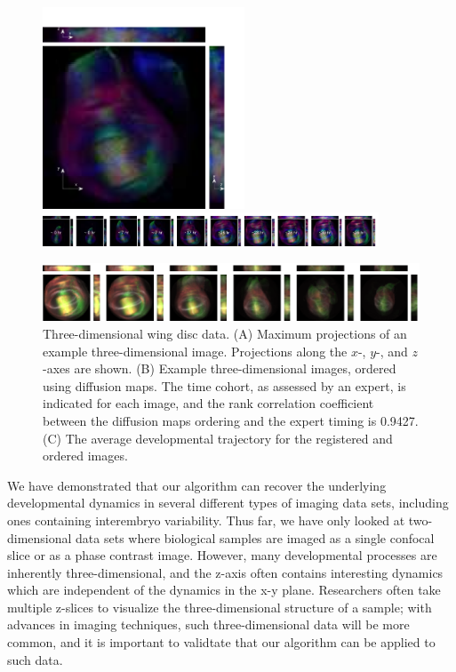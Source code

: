 \documentclass[twocolumn, 10pt]{article}
\begin{document}
\begin{figure}[t]
\includegraphics[width=6cm]{wing_disc_example}
%
\hfill
%
\includegraphics[width=10cm]{wing_disc_ordered}

\vspace{0.25cm}
\includegraphics[width=17.5cm]{wing_disc_average}

\caption{Three-dimensional wing disc data. (A) Maximum projections of an example three-dimensional image. Projections along the $x$-, $y$-, and $z$-axes are shown. (B) Example three-dimensional images, ordered using diffusion maps. The time cohort, as assessed by an expert, is indicated for each image, and the rank correlation coefficient between the diffusion maps ordering and the expert timing is 0.9427. (C) The average developmental trajectory for the registered and ordered images. }
\label{fig:wing_disc}
\end{figure}

We have demonstrated that our algorithm can recover the underlying developmental dynamics in several different types of imaging data sets, including ones containing interembryo variability. 
%
Thus far, we have only looked at two-dimensional data sets where biological samples are imaged as a single confocal slice or as a phase contrast image. 
%
However, many developmental processes are inherently three-dimensional, and the z-axis often contains interesting dynamics which are independent of the dynamics in the x-y plane. 
%
Researchers often take multiple z-slices to visualize the three-dimensional structure of a sample;
with advances in imaging techniques, such three-dimensional data will be more common, and it is important to validtate that our algorithm can be applied to such data. 
\end{document}
